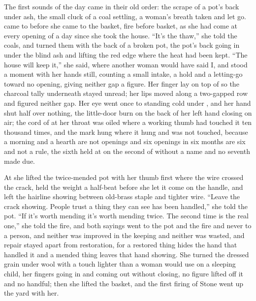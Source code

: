 The first sounds of the day came in their old order: the scrape of a pot's back under ash, the small cluck of a coal settling, a woman's breath taken and let go.  came to  before she came to the basket, fire before basket, as she had come at every opening of a day since she took the house. “It's the thaw,” she told the coals, and turned them with the back of a broken pot, the pot's back going in under the blind ash and lifting the red edge where the heat had been kept. “The house will keep it,” she said, where another woman would have said I, and stood a moment with her hands still, counting a small intake, a hold and a letting-go toward no opening, giving neither gap a figure. Her finger lay on top of  so the charcoal tally underneath stayed unread; her lips moved along a two-gapped row and figured neither gap. Her eye went once to  standing cold under , and her hand shut half over nothing, the little-door burn on the back of her left hand closing on air; the cord of  at her throat was oiled where a working thumb had touched it ten thousand times, and the mark hung where it hung and was not touched, because a morning and a hearth are not openings and six openings in six months are six and not a rule, the sixth held at  on the second of  without a name and no seventh made due.

At  she lifted the twice-mended pot with her thumb first where the wire crossed the crack, held the weight a half-beat before she let it come on the handle, and left the hairline showing between old-brass staple and tighter wire. “Leave the crack showing. People trust a thing they can see has been handled,” she told the pot. “If it's worth mending it's worth mending twice. The second time is the real one,” she told the fire, and both sayings went to the pot and the fire and never to a person, and neither was improved in the keeping and neither was wasted, and repair stayed apart from restoration, for a restored thing hides the hand that handled it and a mended thing leaves that hand showing. She turned the dressed grain under wool with a touch lighter than a woman would use on a sleeping child, her fingers going in and coming out without closing, no figure lifted off it and no handful; then she lifted the basket, and the first firing of Stone went up the yard with her.

